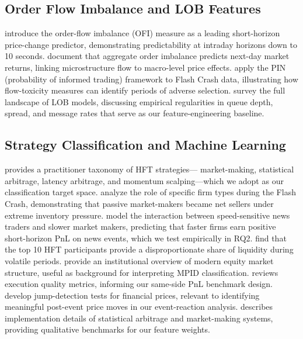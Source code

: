 \documentclass[11pt, letterpaper]{article}
\begin{document}
\subsection{Order Flow Imbalance and LOB Features}

\citet{Cont2014} introduce the order-flow imbalance (OFI) measure as a leading
short-horizon price-change predictor, demonstrating predictability at intraday
horizons down to 10 seconds.
\citet{Chordia2002} document that aggregate order imbalance predicts next-day
market returns, linking microstructure flow to macro-level price effects.
\citet{Easley2011} apply the PIN (probability of informed trading) framework to
Flash Crash data, illustrating how flow-toxicity measures can identify
periods of adverse selection.
\citet{Gould2013} survey the full landscape of LOB models, discussing empirical
regularities in queue depth, spread, and message rates that serve as our
feature-engineering baseline.

\subsection{Strategy Classification and Machine Learning}

\citet{Aldridge2013} provides a practitioner taxonomy of HFT strategies---
market-making, statistical arbitrage, latency arbitrage, and momentum
scalping---which we adopt as our classification target space.
\citet{Kirilenko2017} analyze the role of specific firm types during the
Flash Crash, demonstrating that passive market-makers became net sellers
under extreme inventory pressure.
\citet{Foucault2016} model the interaction between speed-sensitive news traders
and slower market makers, predicting that faster firms earn positive
short-horizon PnL on news events, which we test empirically in RQ2.
\citet{Jarnecic2014} find that the top 10 HFT participants provide a
disproportionate share of liquidity during volatile periods.
\citet{Angel2011} provide an institutional overview of modern equity market
structure, useful as background for interpreting MPID classification.
\citet{Bessembinder2003} reviews execution quality metrics, informing our
same-side PnL benchmark design.
\citet{Lee2008} develop jump-detection tests for financial prices, relevant
to identifying meaningful post-event price moves in our event-reaction analysis.
\citet{Narang2013} describes implementation details of statistical arbitrage and
market-making systems, providing qualitative benchmarks for our feature weights.
\end{document}
